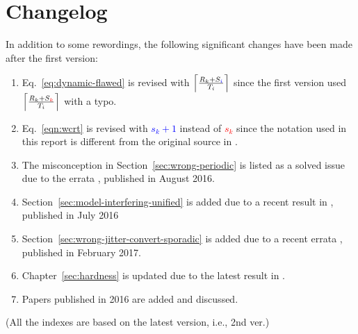 \documentclass[twoside,titlepage,fleqn,
                pointlessnumbers,headinclude,BCOR5mm,
                ]{scrreprt}
\newcommand{\ceiling}[1]{\left\lceil{#1}\right\rceil}
\begin{document}
\frenchspacing
\raggedbottom
{} %
\pagestyle{plain}
%


\cleardoublepage
\pagestyle{scrheadings}
\cleardoublepage












\newpage

\chapter*{Changelog}

In addition to some rewordings, the following significant changes have
been made after the first version:
\begin{enumerate}
\item Eq.~\eqref{eq:dynamic-flawed} is revised with
  $\ceiling{\frac{R_k + S_{\textcolor{blue}{i}}}{T_i}}$  since the first
  version used $\ceiling{\frac{R_k + S_{\textcolor{red}{k}}}{T_i}}$
  with a typo.
\item Eq.~\eqref{eqn:wcrt} is revised with \textcolor{blue}{$s_k+1$} instead of
  \textcolor{red}{$s_k$} since the notation used in this report is different
  from the original source in \cite{lakshmanan-2009}.
\item The misconception in Section~\ref{sec:wrong-periodic} is 
  listed as a solved issue due to the errata \cite{Kim2016}, published
  in August 2016.
\item Section~\ref{sec:model-interfering-unified} is added due to a
  recent result in \cite{ChenECRTS2016-suspension}, published in July 2016
\item Section~\ref{sec:wrong-jitter-convert-sporadic} is added due to
  a recent errata \cite{nelissen-errata-ECRTS15}, published in
  February 2017.
\item Chapter~\ref{sec:hardness} is updated due to the latest result
  in \cite{RTSS2016-suspension,DBLP:conf/rtns/MohaqeqiE016}.
\item Papers published in 2016 are added and discussed.
\end{enumerate}
(All the indexes are based on the latest version, i.e., 2nd ver.)



{}


%
\end{document}
